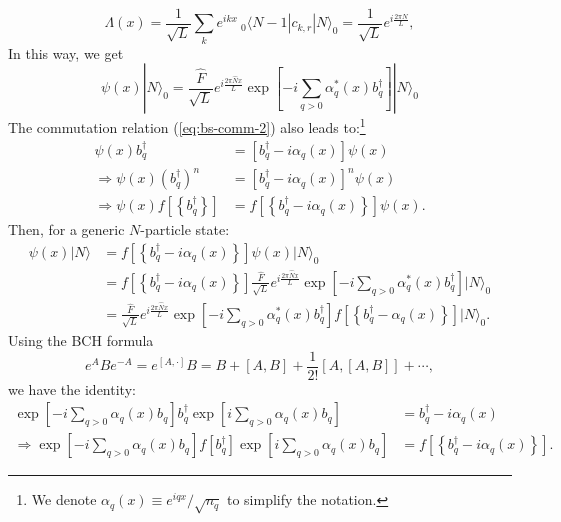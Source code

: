 \documentclass[aps,prb,superscriptaddress,nofootinbib]{revtex4}
\begin{document}
\begin{equation}
	\Lambda(x) = \frac{1}{\sqrt L}\sum_k e^{ikx}\ {}_{0}\langle N-1| c_{k,r}|N\rangle_0 
	= \frac{1}{\sqrt L} e^{i\frac{2\pi N}{L}},
\end{equation}
In this way, we get
\begin{equation}
	\psi(x)|N\rangle_{0} = \frac{\hat F}{\sqrt{L}} e^{i \frac{2 \pi \hat{N} x}{L}} \exp \left[-i\sum_{q>0} \alpha^*_q(x) b_{q}^{\dagger}\right]|N\rangle_{0}
\end{equation}
The commutation relation (\ref{eq:bs-comm-2}) also leads to:\footnote{We denote $\alpha_q(x) \equiv e^{iqx}/\sqrt{n_q}$ to simplify the notation.}
\begin{equation*}
\begin{aligned}
	\psi(x) b_{q}^{\dagger} 
	&=\left[b_{q}^{\dagger}-i\alpha_{q}(x)\right] \psi(x) \\
	\Rightarrow \psi(x)\left(b_{q}^{\dagger}\right)^{n} 
	&=\left[b_{q}^{\dagger}-i\alpha_{q}(x)\right]^{n} \psi(x) \\
	\Rightarrow \psi(x) f\left[\left\{b_{q}^{\dagger}\right\}\right] 
	&=f\left[\left\{b_{q}^{\dagger}-i\alpha_{q}(x)\right\}\right] \psi(x).
\end{aligned}
\end{equation*}
Then, for a generic $N$-particle state:
\begin{equation}\label{eq:bs-temp1}
\begin{aligned}
	\psi(x)|N\rangle 
	&=f\left[\left\{b_{q}^{\dagger}-i\alpha_{q}(x)\right\}\right] \psi(x)|N\rangle_{0} \\
	&=f\left[\left\{b_{q}^{\dagger}-i\alpha_{q}(x)\right\}\right] \frac{\hat{F}}{\sqrt{L}} e^{i \frac{2 \pi \hat{N} x}{L}} \exp \left[-i\sum_{q>0} \alpha^*_{q}(x) b_{q}^{\dagger}\right]|N\rangle_{0} \\
	&=\frac{\hat{F}}{\sqrt{L}} e^{i \frac{2 \pi \hat{N} x}{L}} \exp \left[-i\sum_{q>0} \alpha^*_{q}(x) b_{q}^{\dagger}\right] f\left[\left\{b_{q}^{\dagger}-\alpha_{q}(x)\right\}\right]|N\rangle_{0}.
\end{aligned}
\end{equation}
Using the BCH formula
\begin{equation}
	e^A B e^{-A} = e^{[A,\cdot]} B = B + [A,B] + \frac{1}{2!}[A,[A,B]]+\cdots,
\end{equation}
we have the identity:
\begin{equation*}
\begin{aligned}
	\exp \left[-i\sum_{q>0} \alpha_{q}(x) b_{q}\right] b_{q}^{\dagger} \exp \left[i\sum_{q>0} \alpha_{q}(x) b_{q}\right] &=b_{q}^{\dagger}-i\alpha_{q}(x) \\
	\Rightarrow \exp \left[-i\sum_{q>0} \alpha_{q}(x) b_{q}\right] f\left[b_{q}^{\dagger}\right] \exp \left[i\sum_{q>0} \alpha_{q}(x) b_{q}\right] &=f\left[\left\{b_{q}^{\dagger}-i\alpha_{q}(x)\right\}\right].
\end{aligned}
\end{equation*}
\end{document}
